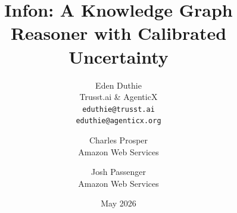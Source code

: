 \documentclass[11pt]{article}
\title{Infon: A Knowledge Graph Reasoner with Calibrated Uncertainty}
\author{
  Eden Duthie \\
  Trusst.ai \& AgenticX \\
  \texttt{eduthie@trusst.ai} \\
  \texttt{eduthie@agenticx.org}
  \and
  Charles Prosper \\
  Amazon Web Services
  \and
  Josh Passenger \\
  Amazon Web Services
}
\date{May 2026}
\begin{document}
\maketitle

\begin{abstract}

\end{abstract}














\end{document}
